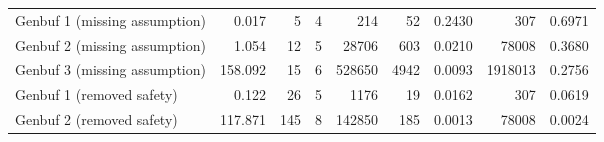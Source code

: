 \begin{tabular}{|l|rr|rr|rr|rr|}
  Genbuf 1 (missing assumption) & 0.017 & 5 & 4 & 214 & 52 & 0.2430 & 307 & 0.6971 \\ 
  Genbuf 2 (missing assumption) & 1.054 & 12 & 5 & 28706 & 603 & 0.0210 & 78008 & 0.3680 \\ 
  Genbuf 3 (missing assumption) & 158.092 & 15 & 6 & 528650 & 4942 & 0.0093 & 1918013 & 0.2756 \\ 
  Genbuf 1 (removed safety) & 0.122 & 26 & 5 & 1176 & 19 & 0.0162 & 307 & 0.0619 \\ 
  Genbuf 2 (removed safety) & 117.871 & 145 & 8 & 142850 & 185 & 0.0013 & 78008 & 0.0024 \\ 
   \hline
\end{tabular}
